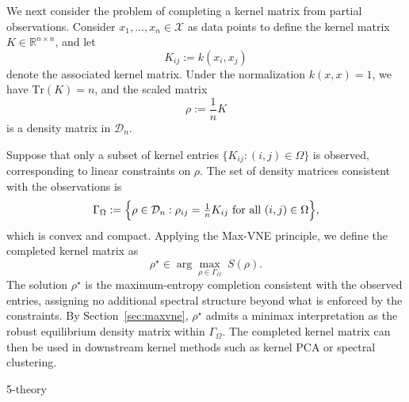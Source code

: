 \documentclass{article}
\newtheorem{remark}{Remark}
\theoremstyle{plain}
\theoremstyle{definition}
\begin{document}
We next consider the problem of completing a kernel matrix from partial observations.
Consider $x_1,\dots,x_n\in\mathcal{X}$ as data points to define the kernel matrix $K\in\mathbb{R}^{n\times n}$, and let
\begin{equation}
K_{ij} := k(x_i,x_j)
\end{equation}
denote the associated kernel matrix.
Under the normalization $k(x,x)=1$, we have $\mathrm{Tr}(K)=n$, and the scaled matrix
\begin{equation}
\rho := \frac{1}{n}K
\end{equation}
is a density matrix in $\mathcal{D}_n$.

Suppose that only a subset of kernel entries
\(
\{K_{ij}:(i,j)\in\Omega\}
\)
is observed, corresponding to linear constraints on $\rho$.
The set of density matrices consistent with the observations is
\begin{equation}
\Gamma_{\Omega}
:=
\Bigl\{
\rho\in\mathcal{D}_n :
\rho_{ij} = \tfrac{1}{n}K_{ij}
\ \text{for all } (i,j)\in\Omega
\Bigr\},
\label{eq:Gamma-omega}
\end{equation}
which is convex and compact. Applying the Max-VNE principle, we define the completed kernel matrix as
\begin{equation}
\rho^\star \in \arg\max_{\rho\in\Gamma_{\Omega}}\;  S(\rho).
\label{eq:maxvne-completion}
\end{equation}
The solution $\rho^\star$ is the maximum-entropy completion consistent with the
observed entries, assigning no additional spectral structure beyond what is
enforced by the constraints.
By Section~\ref{sec:maxvne}, $\rho^\star$ admits a minimax interpretation as the
robust equilibrium density matrix within $\Gamma_{\Omega}$.
The completed kernel matrix can then be used in downstream kernel methods such as
kernel PCA or spectral clustering.

5-theory
\end{document}
